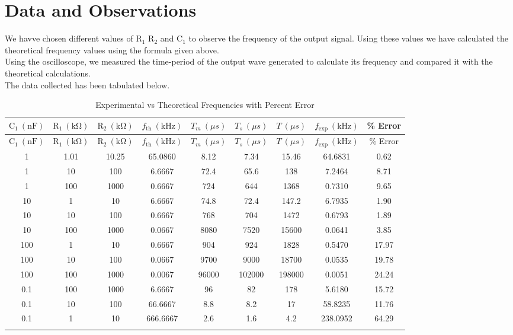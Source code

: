 \documentclass[12pt]{article}
\begin{document}
\section{Data and Observations}
We havve chosen different values of $\mathrm{R_1}$ $\mathrm{R_2}$ and $\mathrm{C_1}$ to observe the frequency of the output signal. Using these values we have calculated the theoretical frequency values using the formula given above.\\
Using the oscilloscope, we measured the time-period of the output wave generated to calculate its frequency and compared it with the theoretical calculations. \\
The data collected has been tabulated below.
\begin{longtable}{|c|c|c|c||c|c|c|c||c|}
    \hline
    $\mathrm{C_1\ (nF)}$ & $\mathrm{R_1\ (k\Omega)}$ & $\mathrm{R_2\ (k\Omega)}$ & $f_\mathrm{th}\ (\mathrm{kHz})$ & $T_m\ (\mu s)$ & $T_s\ (\mu s)$ & $T\ (\mu s)$ & $f_\mathrm{exp}\ (\mathrm{kHz})$ & \% Error \\
    \hline
    \endfirsthead
    
    \hline
    $\mathrm{C_1\ (nF)}$ & $\mathrm{R_1\ (k\Omega)}$ & $\mathrm{R_2\ (k\Omega)}$ & $f_\mathrm{th}\ (\mathrm{kHz})$ & $T_m\ (\mu s)$ & $T_s\ (\mu s)$ & $T\ (\mu s)$ & $f_\mathrm{exp}\ (\mathrm{kHz})$ & \% Error \\
    \hline
    \endhead
    
    \hline
    \endfoot
    
    \endlastfoot
    
    1 & 1.01 & 10.25 & 65.0860 & 8.12 & 7.34 & 15.46 & 64.6831 & 0.62 \\ \hline
    1 & 10 & 100 & 6.6667 & 72.4 & 65.6 & 138 & 7.2464 & 8.71 \\ \hline
    1 & 100 & 1000 & 0.6667 & 724 & 644 & 1368 & 0.7310 & 9.65 \\ \hline
    10 & 1 & 10 & 6.6667 & 74.8 & 72.4 & 147.2 & 6.7935 & 1.90 \\ \hline
    10 & 10 & 100 & 0.6667 & 768 & 704 & 1472 & 0.6793 & 1.89 \\ \hline
    10 & 100 & 1000 & 0.0667 & 8080 & 7520 & 15600 & 0.0641 & 3.85 \\ \hline
    100 & 1 & 10 & 0.6667 & 904 & 924 & 1828 & 0.5470 & 17.97 \\ \hline
    100 & 10 & 100 & 0.0667 & 9700 & 9000 & 18700 & 0.0535 & 19.78 \\ \hline
    100 & 100 & 1000 & 0.0067 & 96000 & 102000 & 198000 & 0.0051 & 24.24 \\ \hline
    0.1 & 100 & 1000 & 6.6667 & 96 & 82 & 178 & 5.6180 & 15.72 \\ \hline
    0.1 & 10 & 100 & 66.6667 & 8.8 & 8.2 & 17 & 58.8235 & 11.76 \\ \hline
    0.1 & 1 & 10 & 666.6667 & 2.6 & 1.6 & 4.2 & 238.0952 & 64.29 \\ \hline
    
    \caption{Experimental vs Theoretical Frequencies with Percent Error}
\end{longtable}
\end{document}

